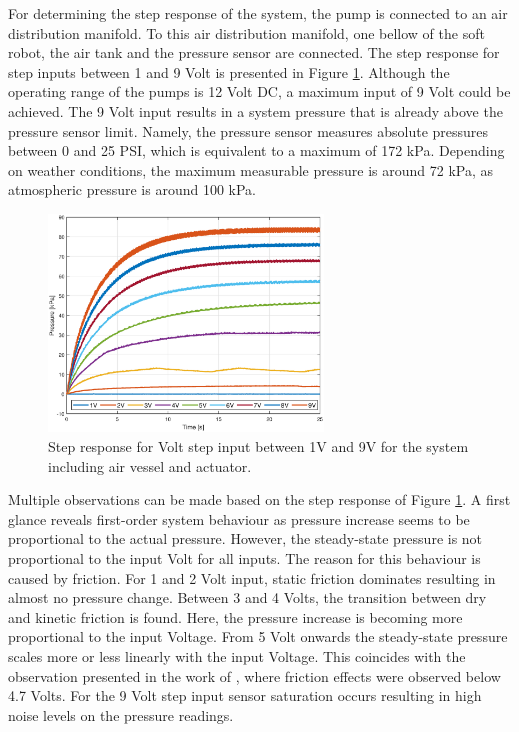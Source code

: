 For determining the step response of the system, the pump is connected to an air distribution manifold. To this air distribution manifold, one bellow of the soft robot, the air tank and the pressure sensor are connected. The step response for step inputs between 1 and 9 Volt is presented in Figure \ref{fig3:pump_dynamics_adapted}. Although the operating range of the pumps is 12 Volt DC, a maximum input of 9 Volt could be achieved. The 9 Volt input results in a system pressure that is already above the pressure sensor limit. Namely, the pressure sensor measures absolute pressures between 0 and 25 PSI, which is equivalent to a maximum of 172 kPa. Depending on weather conditions, the maximum measurable pressure is around 72 kPa, as atmospheric pressure is around 100 kPa.

\begin{figure}[H]
    \centering
    \includegraphics[width = 0.65\textwidth]{Figures/Chapter3/presstep.eps}
    \caption{Step response for Volt step input between 1V and 9V for the system including air vessel and actuator.}
    \label{fig3:pump_dynamics_adapted}
\end{figure}


Multiple observations can be made based on the step response of Figure \ref{fig3:pump_dynamics_adapted}. A first glance reveals first-order system behaviour as pressure increase seems to be proportional to the actual pressure. However, the steady-state pressure is not proportional to the input Volt for all inputs. The reason for this behaviour is caused by friction. For 1 and 2 Volt input, static friction dominates resulting in almost no pressure change. Between 3 and 4 Volts, the transition between dry and kinetic friction is found. Here, the pressure increase is becoming more proportional to the input Voltage. From 5 Volt onwards the steady-state pressure scales more or less linearly with the input Voltage. This coincides with the observation presented in the work of \cite{berkers}, where friction effects were observed below 4.7 Volts. For the 9 Volt step input sensor saturation occurs resulting in high noise levels on the pressure readings.

